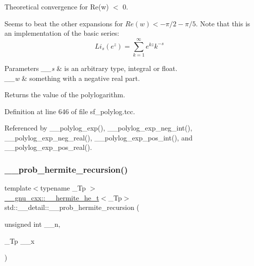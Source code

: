 Theoretical convergence for Re(w) $<$ 0.

Seems to beat the other expansions for $ Re(w) < -\pi/2 - \pi/5 $. Note that this is an implementation of the basic series\+: \[ Li_s(e^z) = \sum_{k=1}^{\infty} e^{kz} k^{-s} \]


\begin{DoxyParams}{Parameters}
{\em \+\_\+\+\_\+s} & is an arbitrary type, integral or float. \\
\hline
{\em \+\_\+\+\_\+w} & something with a negative real part. \\
\hline
\end{DoxyParams}
\begin{DoxyReturn}{Returns}
the value of the polylogarithm. 
\end{DoxyReturn}


Definition at line 646 of file sf\+\_\+polylog.\+tcc.



Referenced by \+\_\+\+\_\+polylog\+\_\+exp(), \+\_\+\+\_\+polylog\+\_\+exp\+\_\+neg\+\_\+int(), \+\_\+\+\_\+polylog\+\_\+exp\+\_\+neg\+\_\+real(), \+\_\+\+\_\+polylog\+\_\+exp\+\_\+pos\+\_\+int(), and \+\_\+\+\_\+polylog\+\_\+exp\+\_\+pos\+\_\+real().

\mbox{\label{namespacestd_1_1____detail_aada7dabf929dbb464ef559feddf0ddc9}} 
\subsubsection{\texorpdfstring{\+\_\+\+\_\+prob\+\_\+hermite\+\_\+recursion()}{\_\_prob\_hermite\_recursion()}}
{\footnotesize\ttfamily template$<$typename \+\_\+\+Tp $>$ \\
\hyperlink{struct____gnu__cxx_1_1____hermite__he__t}{\+\_\+\+\_\+gnu\+\_\+cxx\+::\+\_\+\+\_\+hermite\+\_\+he\+\_\+t}$<$\+\_\+\+Tp$>$ std\+::\+\_\+\+\_\+detail\+::\+\_\+\+\_\+prob\+\_\+hermite\+\_\+recursion (\begin{DoxyParamCaption}\item[{unsigned int}]{\+\_\+\+\_\+n,  }\item[{\+\_\+\+Tp}]{\+\_\+\+\_\+x }\end{DoxyParamCaption})}




